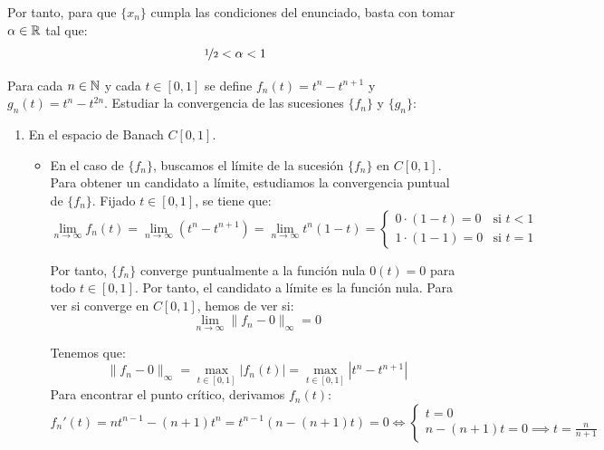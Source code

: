 \begin{ejercicio}
\begin{enumerate}
    Por tanto, para que $\{x_n\}$ cumpla las condiciones del enunciado, basta con tomar $\alpha\in \mathbb{R}$ tal que:
    \begin{equation*}
        \nicefrac{1}{2} < \alpha < 1
    \end{equation*}
\end{enumerate}
\end{ejercicio}

\begin{ejercicio}
Para cada $n \in \mathbb{N}$ y cada $t \in \left[0, 1\right]$ se define $f_n(t) = t^n - t^{n+1}$ y $g_n(t) = t^n - t^{2n}$. Estudiar la convergencia de las sucesiones $\{f_n\}$ y $\{g_n\}$:
\begin{enumerate}
    \item En el espacio de Banach $C\left[0, 1\right]$.
    \begin{itemize}
        \item En el caso de $\{f_n\}$, buscamos el límite de la sucesión $\{f_n\}$ en $C\left[0, 1\right]$. Para obtener un candidato a límite, estudiamos la convergencia puntual de $\{f_n\}$. Fijado $t \in \left[0, 1\right]$, se tiene que:
        \begin{equation*}
            \lim_{n \to \infty} f_n(t) = \lim_{n \to \infty} (t^n - t^{n+1}) = \lim_{n \to \infty} t^n (1 - t) = \begin{cases}
                0 \cdot (1 - t) = 0 & \text{si } t<1\\
                1 \cdot (1 - 1) = 0 & \text{si } t=1
            \end{cases}
        \end{equation*}

        Por tanto, $\{f_n\}$ converge puntualmente a la función nula $0(t) = 0$ para todo $t \in \left[0, 1\right]$. Por tanto, el candidato a límite es la función nula. Para ver si converge en $C\left[0, 1\right]$, hemos de ver si:
        \begin{equation*}
            \lim_{n \to \infty} \|f_n - 0\|_\infty = 0
        \end{equation*}

        Tenemos que:
        \begin{equation*}
            \|f_n-0\|_\infty = \max_{t \in \left[0, 1\right]} |f_n(t)| = \max_{t \in \left[0, 1\right]} |t^n - t^{n+1}|
        \end{equation*}
        Para encontrar el punto crítico, derivamos $f_n(t)$:
        \begin{equation*}
            f_n'(t) = n t^{n-1} - (n+1) t^n = t^{n-1} (n - (n+1)t) = 0\iff \begin{cases}
                t = 0\\
                n - (n+1)t = 0 \implies t = \frac{n}{n+1}
            \end{cases}
        \end{equation*}


\end{itemize}
\end{enumerate}
\end{ejercicio}
